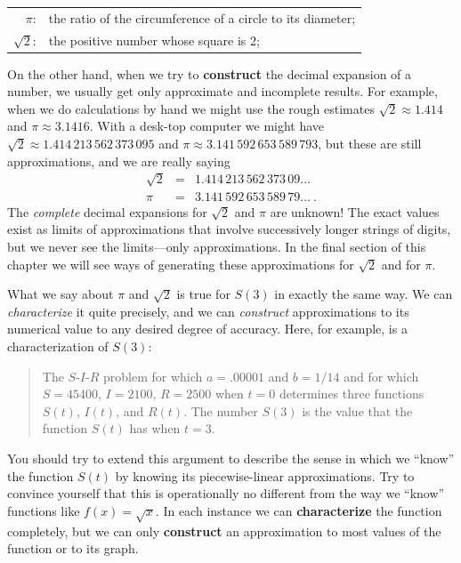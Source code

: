 \begin{tabular}{rl}
	$\pi$: & the ratio of the circumference of a circle to its diameter; \\
	$\sqrt{2}$: & the positive number whose square is 2; \\
\end{tabular}

On the other hand, when we try to {\bf construct} the decimal
 expansion of a number, we usually get only approximate and incomplete
 results.  For example, when we do calculations by hand we might use
 the rough estimates $\sqrt{2} \approx 1.414$ and $\pi \approx
 3.1416$.  With a desk-top computer we might have $\sqrt{2} \approx
 1.414\,213\,562\,373\,095$ and $\pi \approx
 3.141\,592\,653\,589\,793$, but these are still approximations, and
 we are really saying
\[
\begin{array}{rcl}
	\sqrt{2} &=& 1.414\,213\,562\,373\,09 \ldots \\
	\pi &=& 3.141\,592\,653\,589\,79 \ldots \ .
	\end{array}
\]
The {\em complete\/} decimal expansions for $\sqrt{2}$ and $\pi$ are
 unknown!  The exact values exist as limits of approximations that
 involve successively longer strings of digits, but we never see the
 limits---only approximations. In the final section of this chapter we
 will see ways of generating these approximations for $\sqrt{2}$ and
 for $\pi$.

What we say about $\pi$ and $\sqrt{2}$ is true for $S(3)$ in exactly
 the same way.  We can {\em characterize\/} it quite precisely, and we
 can {\em construct\/} approximations to its numerical value to any
 desired degree of accuracy.  Here, for example, is a characterization
 of $S(3)$:
\begin{quote}
The $S$-$I$-$R$ problem for which $a = .00001$ and $b = 1/14$ and for
 which $S = 45400$, $I = 2100$, $R = 2500$ when $t = 0$ determines
 three functions $S(t)$, $I(t)$, and $R(t)$.  The number $S(3)$ is the
 value that the function $S(t)$ has when $t = 3$.
\end{quote} 

You should try to extend this argument to describe the sense in which
 we ``know'' the function $S(t)$ by knowing its piecewise-linear
 approximations. Try to convince yourself that this is operationally
 no different from the way we ``know'' functions like $f(x)=\sqrt{x}$.
  In each instance we can {\bf characterize} the function completely,
 but we can only {\bf construct} an approximation to most values of
 the function or to its graph.

